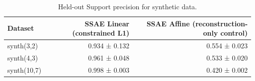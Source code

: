 \begin{table}[t]
\centering
\caption{Held-out Support precision for synthetic data.}
\label{tab:synthetic-support-precision}
\begin{tabular}{lrr}
\toprule
Dataset & SSAE Linear (constrained L1) & SSAE Affine (reconstruction-only control) \\
\midrule
synth(3,2) & 0.934 ± 0.132 & 0.554 ± 0.023 \\
synth(4,3) & 0.961 ± 0.048 & 0.533 ± 0.020 \\
synth(10,7) & 0.998 ± 0.003 & 0.420 ± 0.002 \\
\bottomrule
\end{tabular}
\end{table}
